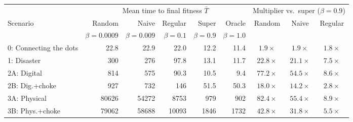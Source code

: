 \begin{tabular}{l rrrrr ccc}
\toprule
 & \multicolumn{5}{c}{Mean time to final fitness $\bar{T}$} & \multicolumn{3}{c}{Multiplier vs.\ super ($\beta\!=\!0.9$)} \\
\cmidrule(lr){2-6} \cmidrule(lr){7-9}
Scenario & Random & Naive & Regular & Super & Oracle & Random & Naive & Regular \\
 & $\beta\!=\!0.0009$ & $\beta\!=\!0.009$ & $\beta\!=\!0.1$ & $\beta\!=\!0.9$ & $\beta\!=\!1.0$ & & & \\
\midrule
0: Connecting the dots & 22.8 & 22.9 & 22.0 & 12.2 & 11.4 & $1.9\times$ & $1.9\times$ & $1.8\times$ \\
1: Disaster & 300 & 276 & 97.8 & 13.1 & 11.7 & $22.8\times$ & $21.1\times$ & $7.5\times$ \\
2A: Digital & 814 & 575 & 90.3 & 10.5 & 9.4 & $77.2\times$ & $54.5\times$ & $8.6\times$ \\
2B: Dig.+choke & 927 & 732 & 146 & 51.5 & 50.3 & $18.0\times$ & $14.2\times$ & $2.8\times$ \\
3A: Physical & 80626 & 54272 & 8753 & 979 & 902 & $82.4\times$ & $55.4\times$ & $8.9\times$ \\
3B: Phys.+choke & 79062 & 58688 & 10093 & 1846 & 1732 & $42.8\times$ & $31.8\times$ & $5.5\times$ \\
\bottomrule
\end{tabular}

